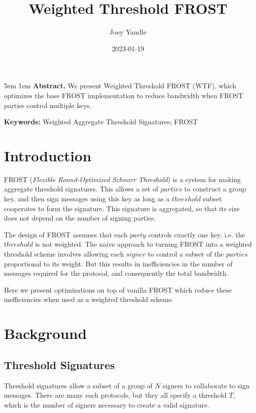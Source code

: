 \documentclass{article}
\title{Weighted Threshold FROST}
\date{2023-01-19}
\author{Joey Yandle}
\begin{document}
\onecolumn
\maketitle

\begingroup
\leftskip5em
\parskip1em
\rightskip\leftskip
\noindent\textbf{Abstract.} We present Weighted Threshold FROST (WTF), which optimizes the base FROST implementation to reduce bandwidth when FROST parties control multiple keys.

\par
\noindent\textbf{Keywords:} Weighted Aggregate Threshold Signatures; FROST
\par
\endgroup

\section{
  Introduction
}

FROST (\emph{Flexible Round-Optimized Schnorr Threshold}) \cite{frost} is a system for making aggregate threshold signatures.  This allows a set of $parties$ to construct a group key, and then sign messages using this key as long as a $threshold$ subset cooperates to form the signature.  This signature is aggregated, so that its size does not depend on the number of signing parties.

The design of FROST assumes that each $party$ controls exactly one key, i.e. the $threshold$ is not weighted.  The naive approach to turning FROST into a weighted threshold scheme involves allowing each $signer$ to control a subset of the $parties$ proportional to its weight.  But this results in inefficiencies in the number of messages required for the protocol, and consequently the total bandwidth.

Here we present optimizations on top of vanilla FROST which reduce these inefficiencies when used as a weighted threshold scheme.  


\newpage
\onecolumn
\section{
  Background
}

\subsection{
  Threshold Signatures
}

Threshold signatures allow a subset of a group of $N$ signers to collaborate to sign messages.  There are many such protocols, but they all specify a threshold $T$, which is the number of signers necessary to create a valid signature.  
\end{document}
